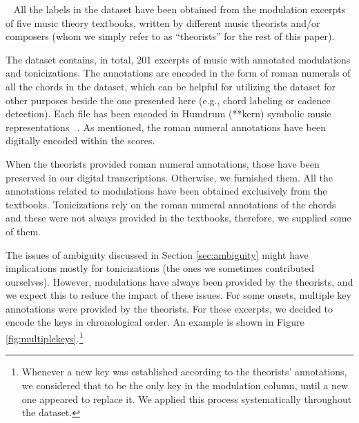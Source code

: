 ~\label{sec:dataset} All the labels in the
dataset have been obtained from the modulation excerpts of
five music theory textbooks, written by different music
theorists and/or composers (whom we simply refer to as
``theorists'' for the rest of this paper).

The dataset contains, in total, 201 excerpts of music with
annotated modulations and tonicizations. The annotations are
encoded in the form of roman numerals of all the chords in
the dataset, which can be helpful for utilizing the dataset
for other purposes beside the one presented here (e.g.,
chord labeling or cadence detection). Each file has been
encoded in Humdrum (**kern) symbolic music representations
~\cite{huron02humdrum}. As mentioned, the roman numeral
annotations have been digitally encoded
\cite{napoleslopez20harmalysis} within the scores.

When the theorists provided roman numeral annotations, those
have been preserved in our digital transcriptions.
Otherwise, we furnished them. All the annotations related to
modulations have been obtained exclusively from the
textbooks. Tonicizations rely on the roman numeral
annotations of the chords and these were not always provided
in the textbooks, therefore, we supplied some of them.

The issues of ambiguity discussed in Section
\ref{sec:ambiguity} might have implications mostly for
tonicizations (the ones we sometimes contributed ourselves).
However, modulations have always been provided by the
theorists, and we expect this to reduce the impact of these
issues. For some onsets, multiple key annotations were
provided by the theorists. For these excerpts, we decided to
encode the keys in chronological order. An example is shown
in Figure \ref{fig:multiplekeys}.\footnote{Whenever a new
key was established according to the theorists' annotations,
we considered that to be the only key in the modulation
column, until a new one appeared to replace it. We applied
this process systematically throughout the dataset.
}


